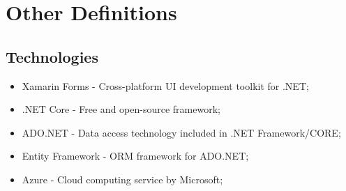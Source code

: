 \chapter{Other Definitions}
\label{app:AppendixA}



\section{Technologies}
\begin{itemize}
	\item Xamarin Forms - Cross-platform UI development toolkit for .NET;
	\item .NET Core - Free and open-source framework;

	\item ADO.NET - Data access technology included in .NET Framework/CORE;
	
	\item Entity Framework - ORM framework for ADO.NET;
	\item Azure - Cloud computing service by Microsoft;
	
\end{itemize}
	